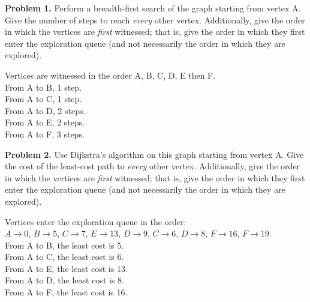 \documentclass{article}
\begin{document}

\vspace*{5mm}\par\textbf{Problem 1.} Perform a breadth-first search of the graph starting from vertex A.  Give the number of steps to reach \emph{every} other vertex.  Additionally, give the order in which the vertices are \emph{first} witnessed; that is, give the order in which they first enter the exploration queue (and not necessarily the order in which they are explored).\par

Vertices are witnessed in the order A, B, C, D, E then F.
\\From A to B, 1 step.
\\From A to C, 1 step.
\\From A to D, 2 steps.
\\From A to E, 2 steps.
\\From A to F, 3 steps.

\vspace*{10mm}\par\textbf{Problem 2.} Use Dijkstra's algorithm on this graph starting from vertex A.  Give the cost of the least-cost path to \emph{every} other vertex.  Additionally, give the order in which the vertices are \emph{first} witnessed; that is, give the order in which they first enter the exploration queue (and not necessarily the order in which they are explored).\par

Vertices enter the exploration queue in the order:
\\$A \rightarrow 0$, $B \rightarrow 5$, $C \rightarrow 7$, $E \rightarrow 13$, $D \rightarrow 9$, $C \rightarrow 6$, $D \rightarrow 8$, $F \rightarrow 16$, $F \rightarrow 19$.
\\From A to B, the least cost is 5.
\\From A to C, the least cost is 6.
\\From A to E, the least cost is 13.
\\From A to D, the least cost is 8.
\\From A to F, the least cost is 16.
\end{document}
